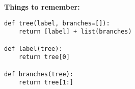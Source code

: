 \textbf{Things to remember:}

\begin{lstlisting}
def tree(label, branches=[]):
    return [label] + list(branches)

def label(tree):
    return tree[0]

def branches(tree):
    return tree[1:]

\end{lstlisting}

